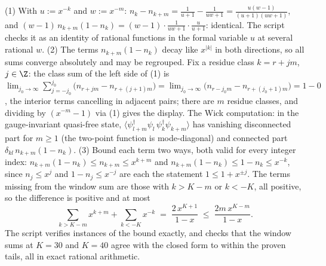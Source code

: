 (1) With $u := x^{-k}$ and $w := x^{-m}$: $n_k - n_{k+m} = \tfrac{1}{u+1} - \tfrac{1}{uw+1} = \tfrac{u(w-1)}{(u+1)(uw+1)}$, and $(w-1)\,n_{k+m}(1-n_k) = (w-1)\cdot\tfrac{1}{uw+1}\cdot\tfrac{u}{u+1}$: identical. The script checks it as an identity of rational functions in the formal variable $u$ at several rational $w$.
(2) The terms $n_{k+m}(1 - n_k)$ decay like $x^{|k|}$ in both directions, so all sums converge absolutely and may be regrouped. Fix a residue class $k = r + jm$, $j \in \Z$: the class sum of the left side of (1) is $\lim_{j_0 \to \infty}\sum_{j=-j_0}^{j_0}\bigl(n_{r+jm} - n_{r+(j+1)m}\bigr) = \lim_{j_0 \to \infty}\bigl(n_{r-j_0 m} - n_{r+(j_0+1)m}\bigr) = 1 - 0$, the interior terms cancelling in adjacent pairs; there are $m$ residue classes, and dividing by $(x^{-m}-1)$ via (1) gives the display. The Wick computation: in the gauge-invariant quasi-free state, $\langle \psi^\dagger_{l+m}\psi_l\,\psi^\dagger_k\psi_{k+m}\rangle$ has vanishing disconnected part for $m \ge 1$ (the two-point function is mode-diagonal) and connected part $\delta_{kl}\,n_{k+m}(1 - n_k)$.
(3) Bound each term two ways, both valid for every integer index: $n_{k+m}(1-n_k) \le n_{k+m} \le x^{k+m}$ and $n_{k+m}(1-n_k) \le 1 - n_k \le x^{-k}$, since $n_j \le x^j$ and $1 - n_j \le x^{-j}$ are each the statement $1 \le 1 + x^{\pm j}$. The terms missing from the window sum are those with $k > K - m$ or $k < -K$, all positive, so the difference is positive and at most
\[
\sum_{k > K-m} x^{k+m} + \sum_{k < -K} x^{-k} \;=\; \frac{2\,x^{K+1}}{1-x} \;\le\; \frac{2m\,x^{K-m}}{1-x}.
\]
The script verifies instances of the bound exactly, and checks that the window sums at $K = 30$ and $K = 40$ agree with the closed form to within the proven tails, all in exact rational arithmetic.
